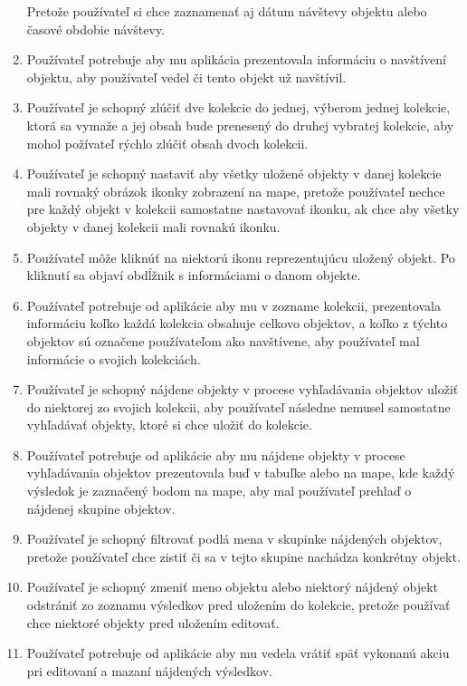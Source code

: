 \begin{enumerate}
            Pretože používateľ si chce zaznamenať aj dátum návštevy objektu alebo časové obdobie návštevy.
      \item Používateľ potrebuje aby mu aplikácia prezentovala informáciu o navštívení objektu, aby používateľ vedel či tento objekt už navštívil.
      \item Používateľ je schopný zlúčiť dve kolekcie do jednej, výberom jednej kolekcie, ktorá sa vymaže a jej obsah bude prenesený do druhej
            vybratej kolekcie, aby mohol požívateľ rýchlo zlúčiť obsah dvoch kolekcii.
      \item Používateľ je schopný nastaviť aby všetky uložené objekty v danej kolekcie mali rovnaký obrázok ikonky zobrazení na mape, pretože používateľ nechce pre každý objekt v kolekcii samostatne nastavovať ikonku,
            ak chce aby všetky objekty v danej kolekcii mali rovnakú ikonku.
      \item Používateľ môže kliknúť na niektorú ikonu reprezentujúcu uložený objekt. Po kliknutí sa objaví obdĺžnik s informáciami o danom objekte.
      \item Používateľ potrebuje od aplikácie aby mu v zozname kolekcii, prezentovala informáciu koľko každá kolekcia obsahuje celkovo objektov,
            a koľko z týchto objektov sú označene používateľom ako navštívene, aby používateľ mal informácie o svojich kolekciách.
      \item Používateľ je schopný nájdene objekty v procese vyhľadávania objektov uložiť do niektorej zo svojich kolekcii, aby používateľ následne nemusel samostatne vyhľadávať objekty, ktoré si chce uložiť do kolekcie.
      \item Používateľ potrebuje od aplikácie aby mu nájdene objekty v procese vyhľadávania objektov prezentovala buď v tabuľke alebo na mape, kde každý výsledok je zaznačený bodom na mape, aby mal používateľ prehlaď o nájdenej skupine objektov.
      \item Používateľ je schopný filtrovať podlá mena v skupinke nájdených objektov, pretože používateľ chce zistiť či sa v tejto skupine nachádza konkrétny objekt.
      \item Používateľ je schopný zmeniť meno objektu alebo niektorý nájdený objekt odstrániť zo zoznamu výsledkov pred uložením do kolekcie, pretože používať chce niektoré objekty pred uložením editovať.
      \item Používateľ potrebuje od aplikácie aby mu vedela vrátiť späť vykonanú akciu pri editovaní a mazaní nájdených výsledkov.
\end{enumerate}


